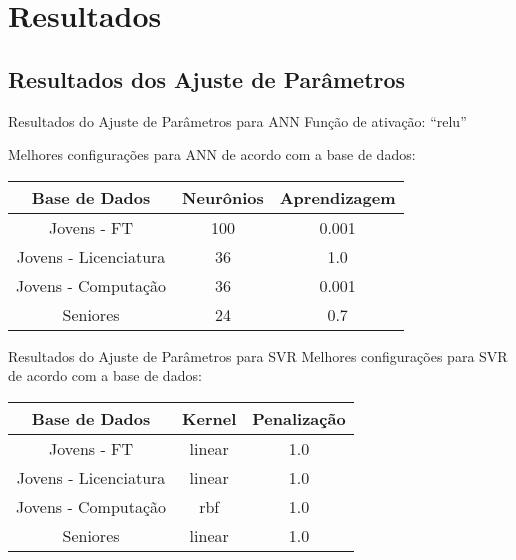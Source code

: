 \section{Resultados}
\subsection{Resultados dos Ajuste de Parâmetros}
\begin{frame}{Resultados do Ajuste de Parâmetros para ANN}
    Função de ativação: ``relu''

    \vspace{0.5cm}

    Melhores configurações para ANN de acordo com a base de dados: 
    \begin{table}
    \begin{center}
        \begin{tabular}[c]{| c | c | c |}
        \hline
        \textbf{Base de Dados} & \textbf{Neurônios} & \textbf{Aprendizagem} \\
        \hline
        Jovens - FT & 100 & 0.001 \\
        \hline
        Jovens - Licenciatura & 36 & 1.0 \\
        \hline
        Jovens - Computação & 36 & 0.001 \\
        \hline
        Seniores & 24  & 0.7 \\
        \hline
    \end{tabular}
    \end{center}
    \end{table}
\end{frame}

\begin{frame}{Resultados do Ajuste de Parâmetros para SVR}
    Melhores configurações para SVR de acordo com a base de dados: 
    \begin{table}
    \begin{center}
    \begin{tabular}[c]{| c | c | c |}
        \hline
        \textbf{Base de Dados} & \textbf{Kernel} & \textbf{Penalização} \\
        \hline
        Jovens - FT & linear & 1.0 \\
        \hline
        Jovens - Licenciatura & linear & 1.0 \\
        \hline
        Jovens - Computação & rbf & 1.0 \\
        \hline
        Seniores & linear & 1.0 \\
        \hline
    \end{tabular}
    \end{center}
    \end{table}
\end{frame}

